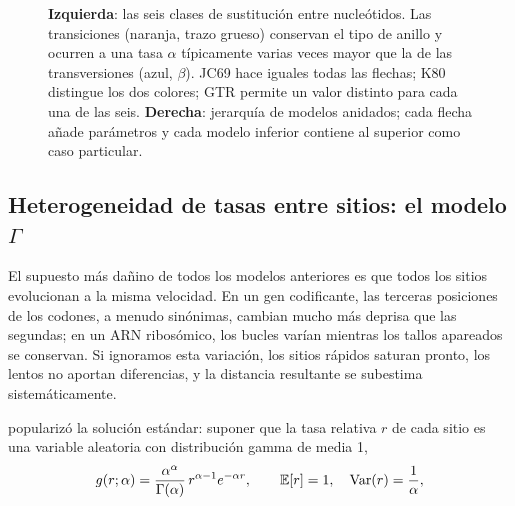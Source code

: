 \begin{figure}[t]
\caption[Tasas de los modelos de sustitución]{\textbf{Izquierda}: las seis clases de sustitución entre nucleótidos. Las transiciones (naranja, trazo grueso) conservan el tipo de anillo y ocurren a una tasa $\alpha$ típicamente varias veces mayor que la de las transversiones (azul, $\beta$). JC69 hace iguales todas las flechas; K80 distingue los dos colores; GTR permite un valor distinto para cada una de las seis. \textbf{Derecha}: jerarquía de modelos anidados; cada flecha añade parámetros y cada modelo inferior contiene al superior como caso particular.}
\label{fig:05-modelos}
\end{figure}

\subsection{Heterogeneidad de tasas entre sitios: el modelo \texorpdfstring{$\Gamma$}{Gamma}}

El supuesto más dañino de todos los modelos anteriores es que todos los sitios evolucionan a la misma velocidad. En un gen codificante, las terceras posiciones de los codones, a menudo sinónimas, cambian mucho más deprisa que las segundas; en un ARN ribosómico, los bucles varían mientras los tallos apareados se conservan. Si ignoramos esta variación, los sitios rápidos saturan pronto, los lentos no aportan diferencias, y la distancia resultante se subestima sistemáticamente.

\textcite{c05-yang1994} popularizó la solución estándar: suponer que la tasa relativa $r$ de cada sitio es una variable aleatoria con distribución gamma de media 1,
\begin{equation}\label{eq:05-gamma}
g(r;\alpha) = \frac{\alpha^{\alpha}}{\Gamma(\alpha)}\, r^{\alpha-1}e^{-\alpha r},\qquad \mathbb{E}[r]=1,\quad \operatorname{Var}(r)=\frac1\alpha,
\end{equation}

\begin{simbolos}
\end{simbolos}

